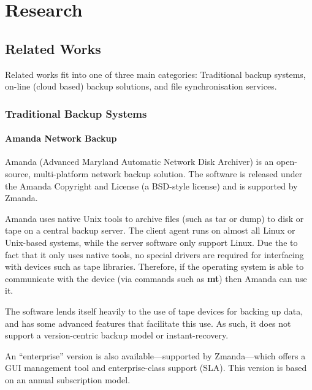 \section{Research}

\begin{bibunit}[plain]

\subsection{Related Works}

Related works fit into one of three main categories: Traditional backup
systems, on-line (cloud based) backup solutions, and file synchronisation
services.

\subsubsection{Traditional Backup Systems}

\paragraph{Amanda Network Backup}

Amanda (Advanced Maryland Automatic Network Disk Archiver) is an open-source,
multi-platform network backup solution\cite{AMANDA-about}. The software is
released under the Amanda Copyright and License (a BSD-style license) and is
supported by Zmanda\cite{AMANDA-license}.

Amanda uses native Unix tools to archive files (such as tar or dump) to disk or
tape on a central backup server. The client agent runs on almost all Linux or
Unix-based systems, while the server software only support Linux. Due the to
fact that it only uses native tools, no special drivers are required for
interfacing with devices such as tape libraries. Therefore, if the operating
system is able to communicate with the device (via commands such as
\textbf{mt}) then Amanda can use it.\cite{AMANDA-about}

The software lends itself heavily to the use of tape devices for backing up
data, and has some advanced features that facilitate this use. As such, it does
not support a version-centric backup model or
instant-recovery.\cite{AMANDA-about}

An ``enterprise'' version is also available---supported by Zmanda---which
offers a GUI management tool and enterprise-class support (SLA).  This version
is based on an annual subscription model\cite{AMANDA-ent}.


\end{bibunit}
